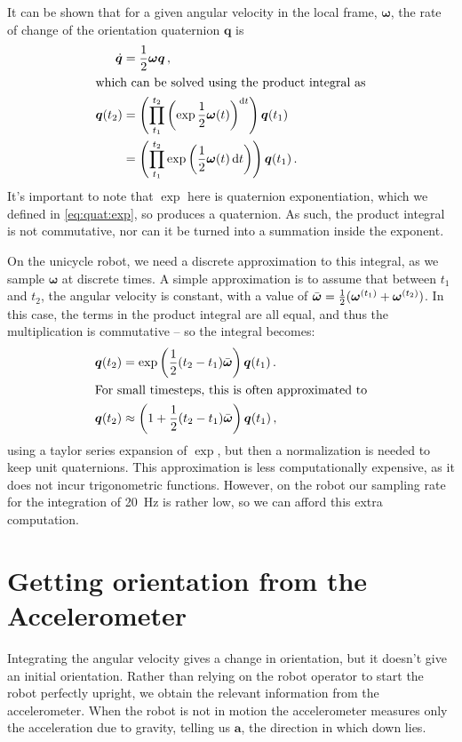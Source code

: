 \documentclass[main.tex]{subfiles}
\begin{document}
	It can be shown that for a given angular velocity in the local frame, $\bm{\omega}$, the rate of change of the orientation quaternion $\bm{q}$ is \cite[p.~10]{boyle2016integration}
	\begin{align}
		\dot{\bm{q}} &= \frac{1}{2}\bm{\omega}\bm{q}\,, \\
	\intertext{which can be solved using the product integral as}
		\bm{q}(t_2)
			&= \left(\prod_{t_1}^{t_2} \left(\exp {\frac{1}{2}\bm{\omega}(t)}\right)^{\mathop{}\!\mathrm{d} t}\right) \bm{q}(t_1) \\
			&= \left(\prod_{t_1}^{t_2} \exp \left({\frac{1}{2}\bm{\omega}(t)} \mathop{}\!\mathrm{d} t\right)\right) \bm{q}(t_1)\,.
	\end{align}
	It's important to note that $\exp$ here is quaternion exponentiation, which we defined in \cref{eq:quat:exp}, so produces a quaternion.
	As such, the product integral is not commutative, nor can it be turned into a summation inside the exponent.

	On the unicycle robot, we need a discrete approximation to this integral, as we sample $\bm{\omega}$ at discrete times.
	A simple approximation is to assume that between $t_1$ and $t_2$, the angular velocity is constant, with a value of $\bar{\bm{\omega}} = \frac{1}{2}(\bm{\omega}^{(t_1)} + \bm{\omega}^{(t_2)})$.
	In this case, the terms in the product integral are all equal, and thus the multiplication is commutative -- so the integral becomes:
	\begin{align}
		\bm{q}(t_2)
			&= \exp \left(
				\frac{1}{2} (t_2 - t_1) \bar{\bm{\omega}}
			\right) \bm{q}(t_1)\,.
		\\
	\intertext{For small timesteps, this is often approximated to}
		\bm{q}(t_2)
			&\approx \left(1 + \frac{1}{2} (t_2 - t_1) \bar{\bm{\omega}}\right) \bm{q}(t_1)\,,
	\end{align}
	using a taylor series expansion of $\exp$, but then a normalization is needed to keep unit quaternions.
	This approximation is less computationally expensive, as it does not incur trigonometric functions.
	However, on the robot our sampling rate for the integration of \SI{20}{\hertz} is rather low, so we can afford this extra computation.

\section{Getting orientation from the Accelerometer}

	Integrating the angular velocity gives a change in orientation, but it doesn't give an initial orientation.
	Rather than relying on the robot operator to start the robot perfectly upright, we obtain the relevant information from the accelerometer. When the robot is not in motion the accelerometer measures only the acceleration due to gravity, telling us $\bm{a}$, the direction in which down lies.
\end{document}
